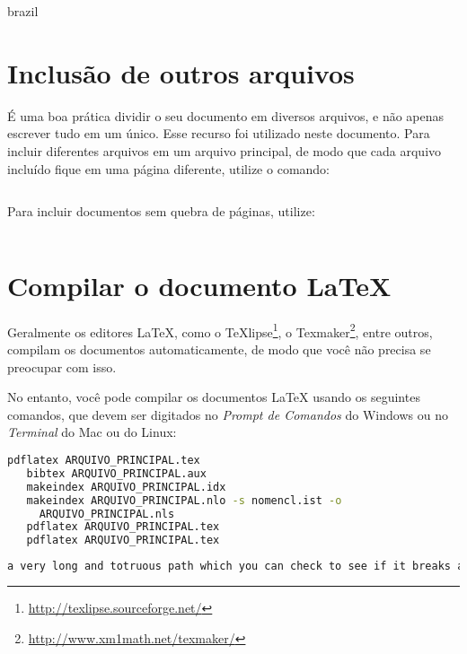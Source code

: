 \begin{otherlanguage*}{brazil}
\section{Inclusão de outros arquivos}\label{sec-include}

É uma boa prática dividir o seu documento em diversos arquivos, e não
apenas escrever tudo em um único. Esse recurso foi utilizado neste
documento. Para incluir diferentes arquivos em um arquivo principal,
de modo que cada arquivo incluído fique em uma página diferente, utilize o
comando:

\begin{lstlisting}[language=tex]
         % sem a extensão .tex
\end{lstlisting}

Para incluir documentos sem quebra de páginas, utilize:

\begin{lstlisting}[language=tex]
         % sem a extensão .tex
\end{lstlisting}

\section{Compilar o documento \LaTeX{}}



Geralmente os editores \LaTeX{}, como o
TeXlipse\footnote{\url{http://texlipse.sourceforge.net/}}, o
Texmaker\footnote{\url{http://www.xm1math.net/texmaker/}}, entre outros,
compilam os documentos automaticamente, de modo que você não precisa se
preocupar com isso.

No entanto, você pode compilar os documentos \LaTeX{} usando os seguintes
comandos, que devem ser digitados no \emph{Prompt de Comandos} do Windows ou no
\emph{Terminal} do Mac ou do Linux:

\begin{lstlisting}[language=bash,caption={Você pode compilar os documentos \LaTeX{} usando os seguintes
comandos.},label={lst:compilarLatex}]
   pdflatex ARQUIVO_PRINCIPAL.tex
   bibtex ARQUIVO_PRINCIPAL.aux
   makeindex ARQUIVO_PRINCIPAL.idx
   makeindex ARQUIVO_PRINCIPAL.nlo -s nomencl.ist -o
     ARQUIVO_PRINCIPAL.nls
   pdflatex ARQUIVO_PRINCIPAL.tex
   pdflatex ARQUIVO_PRINCIPAL.tex
\end{lstlisting}

\begin{lstlisting}[language=bash]
a very long and totruous path which you can check to see if it breaks and where at the end of the line
\end{lstlisting}



\end{otherlanguage*}
